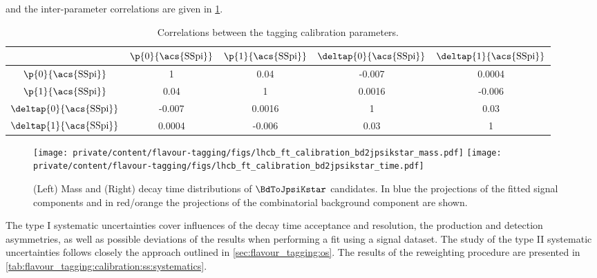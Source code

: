 %
and the inter-parameter correlations are given in
\cref{tab:flavour_tagging:calibration:ss:correlations}.
%
\begin{table}
  \centering
  \caption{Correlations between the \SSpi tagging calibration parameters.}
  \label{tab:flavour_tagging:calibration:ss:correlations}
  \begin{tabular}{ccccc}
    \toprule
    & $\p{0}{\text{\acs{SSpi}}}$ & $\p{1}{\text{\acs{SSpi}}}$ & $\deltap{0}{\text{\acs{SSpi}}}$ & $\deltap{1}{\text{\acs{SSpi}}}$ \\
    \midrule
    $\p{0}{\text{\acs{SSpi}}}$ & 1 & 0.04 & -0.007 & 0.0004 \\
    $\p{1}{\text{\acs{SSpi}}}$ & 0.04 & 1 & 0.0016 & -0.006 \\
    $\deltap{0}{\text{\acs{SSpi}}}$ & -0.007 & 0.0016 & 1 & 0.03 \\
    $\deltap{1}{\text{\acs{SSpi}}}$ & 0.0004 & -0.006 & 0.03 & 1 \\
    \bottomrule
  \end{tabular}
\end{table}
%
\begin{figure}[t]
  \texttt{[image: private/content/flavour-tagging/figs/lhcb\_ft\_calibration\_bd2jpsikstar\_mass.pdf]}
  \texttt{[image: private/content/flavour-tagging/figs/lhcb\_ft\_calibration\_bd2jpsikstar\_time.pdf]}
  \caption{(Left) Mass and (Right) decay time distributions of $\BdToJpsiKstar$
  candidates. In blue the projections of the fitted signal components and in
  red/orange the projections of the combinatorial background component are
  shown. \cite{FT:RunI}}
  \label{fig:flavour_tagging:calibration:ss:fit}
\end{figure}
%
The type I systematic uncertainties cover influences of the decay time
acceptance and resolution, the production and detection asymmetries, as well as
possible deviations of the results when performing a fit using a signal
\sweighted dataset. The study of the type II systematic uncertainties follows
closely the approach outlined in \cref{sec:flavour_tagging:os}. 
The results of the reweighting procedure are presented in
\cref{tab:flavour_tagging:calibration:ss:systematics}.
%
